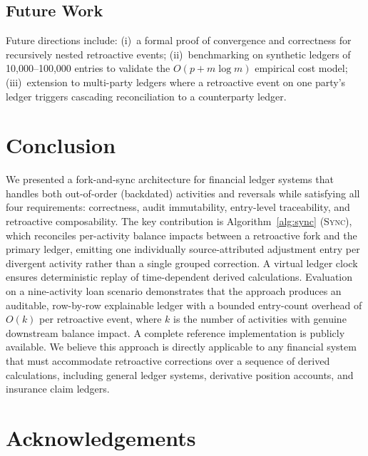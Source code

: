 \documentclass[11pt,letterpaper]{article}
\begin{document}
\subsection{Future Work}

Future directions include: (i)~a formal proof of convergence and
correctness for recursively nested retroactive events;
(ii)~benchmarking on synthetic ledgers of 10,000--100,000 entries to
validate the $O(p + m \log m)$ empirical cost model;
(iii)~extension to multi-party ledgers where a retroactive event on one
party's ledger triggers cascading reconciliation to a counterparty
ledger.

\section{Conclusion}
\label{sec:conclusion}

We presented a fork-and-sync architecture for financial ledger systems
that handles both out-of-order (backdated) activities and reversals
while satisfying all four requirements: correctness, audit immutability,
entry-level traceability, and retroactive composability.
The key contribution is Algorithm~\ref{alg:sync} (\textsc{Sync}), which
reconciles per-activity balance impacts between a retroactive fork and
the primary ledger, emitting one individually source-attributed
adjustment entry per divergent activity rather than a single grouped
correction. A virtual ledger clock ensures deterministic replay of
time-dependent derived calculations. Evaluation on a nine-activity loan
scenario demonstrates that the approach produces an auditable,
row-by-row explainable ledger with a bounded entry-count overhead of
$O(k)$ per retroactive event, where $k$ is the number of activities
with genuine downstream balance impact. A complete reference
implementation is publicly available. We believe this approach is
directly applicable to any financial system that must accommodate
retroactive corrections over a sequence of derived calculations,
including general ledger systems, derivative position accounts, and
insurance claim ledgers.

\section*{Acknowledgements}
\end{document}
